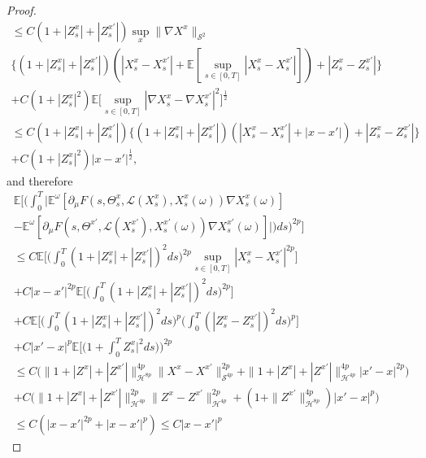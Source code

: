 \documentclass[12,english]{amsart}
\theoremstyle{plain}
\theoremstyle{definition}
\theoremstyle{plain}
\theoremstyle{plain}
\theoremstyle{remark}
\newcommand{\E}{\mathbb E}
\newcommand{\cH}{\mathcal H}
\newcommand{\cL}{\mathcal L}
\newcommand{\cS}{\mathcal S}
\newcommand{\om}{\omega}
\newcommand{\Te}{\Theta}
\begin{document}
\begin{proof}
\begin{multline*}
 \le C (1+|Z^x_s|+|Z^{x'}_s|)\sup_x\|\nabla X^x\|_{\cS^2}\\
\{(1+|Z^x_s|+|Z^{x'}_s|)(|X^x_s-X^{x'}_s|+\E[\sup_{s\in[0,T]}|X^x_s-X^{x'}_s|])+|Z^x_s-Z^{x'}_s|\}\\+
C (1+|Z^x_s|^2)\E\big[\sup_{s\in[0,T]}|\nabla X^x_s-\nabla X^{x'}_s|^2\big]^\frac12
 \\
\le C (1+|Z^x_s|+|Z^{x'}_s|) \{(1+|Z^x_s|+|Z^{x'}_s|)(|X^x_s-X^{x'}_s|+|x-x'|)+|Z^x_s-Z^{x'}_s|\}\\
+C(1+|Z^x_s|^2)|x-x'|^\frac12,
\end{multline*}
and therefore
\begin{multline*}
  \E\Big[\Big(\int_0^T\big|\E^\om[\partial_\mu F(s,\Te^x_s,\cL(X^x_s), X^x_s(\om))\nabla X^x_s(\om)]
  \\-\E^\om[\partial_\mu F(s,\Te^{x'},\cL(X^{x'}_s), X^{x'}_s(\om)) \nabla X^{x'}_s(\om)]\big|)ds\Big)^{2p}\Big]\\\le
C  \E\Big[\Big(\int_0^T (1+|Z^x_s|+|Z^{x'}_s|)^2ds\Big)^{2p}\sup_{s\in[0,T]}|X^x_s-X^{x'}_s|^{2p}\Big]\\+C|x-x'|^{2p}\E\Big[\Big(\int_0^T (1+|Z^x_s|+|Z^{x'}_s|)^2ds\Big)^{2p}\Big]\\+C\E\Big[\Big(\int_0^T (1+|Z^x_s|+|Z^{x'}_s|)^2ds\Big)^p\Big(\int_0^T (|Z^x_s-Z^{x'}_s|)^2ds\Big)^p\Big]\\
+C|x'-x|^p\E\Big[\Big(1+\int_0^T Z^x_s|^2ds)\Big)^{2p}\\
\le C \big(
\|1+|Z^x|+|Z^{x'}|\|_{\cH^{8p}}^{4p}\|X^x-X^{x'}\|_{\cS^{4p}}^{2p}+\|1+|Z^x|+|Z^{x'}|\|_{\cH^{4p}}^{4p}|x'-x|^{2p}\big)\\
+ C \big(\|1+|Z^x|+|Z^{x'}|\|_{\cH^{4p}}^{2p}\|Z^x-Z^{x'}\|_{\cH^{4p}}^{2p}+(1+\|Z^{x'}\|_{\cH^{8p}}^{4p})|x'-x|^p\big)\\\le
C(|x-x'|^{2p}+|x-x'|^p)\le C|x-x'|^p
  \end{multline*}
\end{proof}
\end{document}
